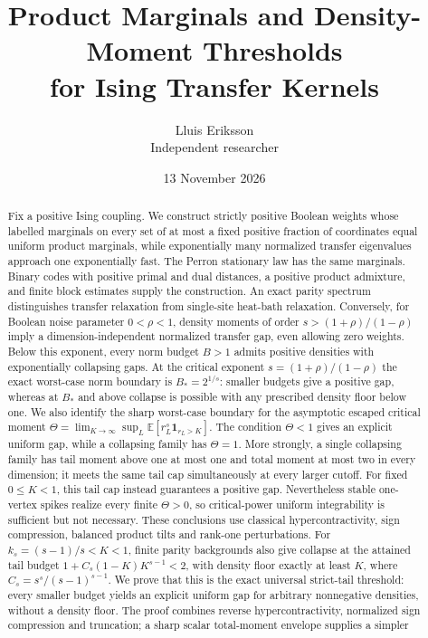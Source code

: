 \documentclass[11pt]{article}
\title{Product Marginals and Density-Moment Thresholds\\for Ising Transfer Kernels}
\author{Lluis Eriksson\\\small Independent researcher}
\date{13 November 2026}
\begin{document}
\maketitle
\begin{abstract}
Fix a positive Ising coupling. We construct strictly positive Boolean
weights whose labelled marginals on every set of at most a fixed positive
fraction of coordinates equal uniform product marginals, while exponentially
many normalized transfer eigenvalues approach one exponentially fast.
The Perron stationary law has the same marginals. Binary codes with positive
primal and dual distances, a positive product admixture, and finite block
estimates supply the construction. An exact parity spectrum distinguishes
transfer relaxation from single-site heat-bath relaxation.
Conversely, for Boolean noise parameter $0<\rho<1$, density moments of order
$s>(1+\rho)/(1-\rho)$ imply a dimension-independent normalized transfer gap,
even allowing zero weights. Below this exponent, every norm budget $B>1$
admits positive densities with exponentially collapsing gaps.
At the critical exponent $s=(1+\rho)/(1-\rho)$ the exact worst-case norm
boundary is $B_*=2^{1/s}$: smaller budgets give a positive gap, whereas
at $B_*$ and above collapse is possible with any prescribed density floor
below one. We also identify the sharp worst-case boundary for the
asymptotic escaped critical moment
$\Theta=\lim_{K\to\infty}\sup_L\mathbb E[r_L^s\mathbf1_{r_L>K}]$.
The condition $\Theta<1$ gives an explicit uniform gap, while a collapsing
family has $\Theta=1$. More strongly, a single collapsing family has tail moment above one
at most one and total moment at most two in every dimension; it meets
the same tail cap simultaneously at every larger cutoff. For fixed
$0\le K<1$, this tail cap instead guarantees a positive gap. Nevertheless stable one-vertex spikes realize every
finite $\Theta>0$, so critical-power uniform integrability is sufficient
but not necessary. These conclusions use classical hypercontractivity,
sign compression, balanced product tilts and rank-one perturbations.
For $k_s=(s-1)/s<K<1$, finite parity backgrounds also give collapse
at the attained tail budget $1+C_s(1-K)K^{s-1}<2$,
with density floor exactly at least $K$, where
$C_s=s^s/(s-1)^{s-1}$. We prove that this is the exact universal
strict-tail threshold: every smaller budget yields an explicit uniform
gap for arbitrary nonnegative densities, without a density floor.
The proof combines reverse hypercontractivity, normalized sign compression
and truncation; a sharp scalar total-moment envelope supplies a simpler

\end{abstract}
\end{document}
